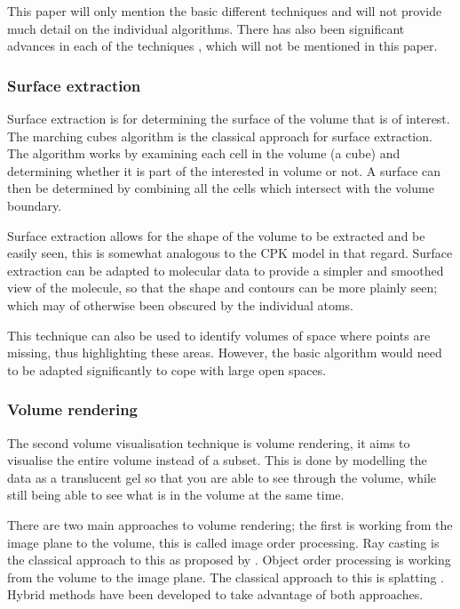 \documentclass[a4paper]{article}
\begin{document}
This paper will only mention the basic different techniques and will not provide
much detail on the individual algorithms. There has also been significant
advances in each of the techniques \citep{brodlie01}, which will not be
mentioned in this paper.

\subsubsection*{Surface extraction}
Surface extraction is for determining the surface of the volume that is of
interest. The marching cubes algorithm \citep{lorensen87} is the classical
approach for surface extraction. The algorithm works by examining each cell in
the volume (a cube) and determining whether it is part of the interested in
volume or not. A surface can then be determined by combining all the cells which
intersect with the volume boundary.

Surface extraction allows for the shape of the volume to be extracted and be
easily seen, this is somewhat analogous to the CPK model in that regard. Surface
extraction can be adapted to molecular data to provide a simpler and smoothed
view of the molecule, so that the shape and contours can be more plainly seen;
which may of otherwise been obscured by the individual atoms.

This technique can also be used to identify volumes of space where points are
missing, thus highlighting these areas. However, the basic algorithm would need
to be adapted significantly to cope with large open spaces.

\subsubsection*{Volume rendering}
The second volume visualisation technique is volume rendering, it aims to
visualise the entire volume instead of a subset. This is done by modelling the
data as a translucent gel so that you are able to see through the volume, while
still being able to see what is in the volume at the same time.

There are two main approaches to volume rendering; the first is working from the
image plane to the volume, this is called image order processing. Ray casting is
the classical approach to this as proposed by \citet{levoy88}. Object order
processing is working from the volume to the image plane. The classical approach
to this is splatting \citep{westover89}. Hybrid methods have been developed to
take advantage of both approaches.
\end{document}

